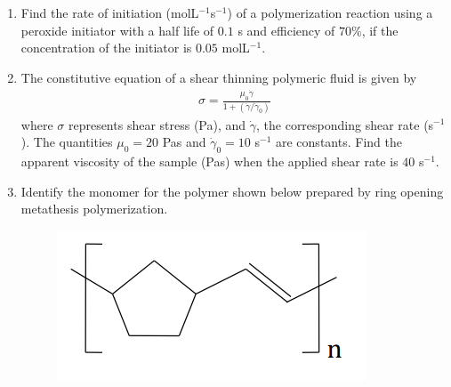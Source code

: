 \documentclass[a4paper,10pt]{article}
\begin{document}
\begin{enumerate}[label=\Alph*)]
    \item Find the rate of initiation (molL$^{-1}$s$^{-1}$) of a polymerization reaction using a peroxide initiator with a half life of $0.1$ s and efficiency of $70\%$, if the concentration of the initiator is $0.05$ molL$^{-1}$.
    
    \hfill{}
    
    \item The constitutive equation of a shear thinning polymeric fluid is given by
    \begin{align*}
        \sigma = \frac{\mu_0 \dot{\gamma}}{1 + (\dot{\gamma}/\dot{\gamma}_0)}
    \end{align*}
    where $\sigma$ represents shear stress (Pa), and $\dot{\gamma}$, the corresponding shear rate (s$^{-1}$). The quantities $\mu_0 = 20$ Pas and $\dot{\gamma}_0 = 10$ s$^{-1}$ are constants. Find the apparent viscosity of the sample (Pas) when the applied shear rate is $40$ s$^{-1}$.
    
    \hfill{}
    
    \item Identify the monomer for the polymer shown below prepared by ring opening metathesis polymerization.
    \begin{figure}[H] \centering \includegraphics[width=0.4\columnwidth]{q13_poly.png} \caption*{} \label{fig:q13_poly} \end{figure}
    

\end{enumerate}
\end{document}
